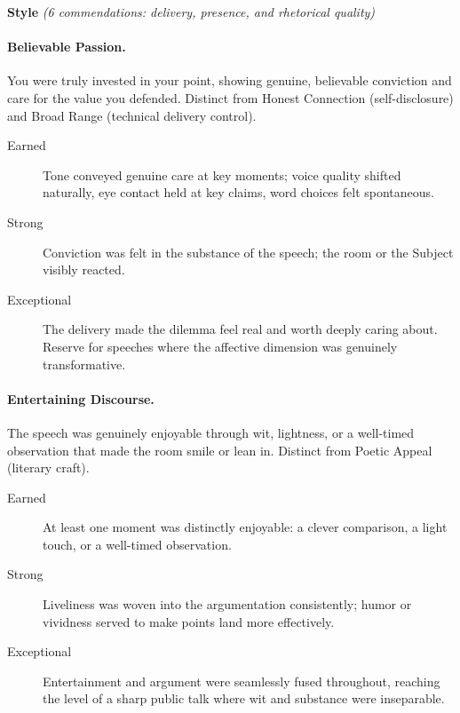 \medskip
\noindent\textbf{Style} \textit{(6 commendations: delivery, presence, and rhetorical quality)}

\paragraph{Believable Passion.} You were truly invested in your point, showing genuine, believable conviction and care for the value you defended. Distinct from Honest Connection (self-disclosure) and Broad Range (technical delivery control).
\begin{description}
    \item[Earned] Tone conveyed genuine care at key moments; voice quality shifted naturally, eye contact held at key claims, word choices felt spontaneous.
    \item[Strong] Conviction was felt in the substance of the speech; the room or the Subject visibly reacted.
    \item[Exceptional] The delivery made the dilemma feel real and worth deeply caring about. Reserve for speeches where the affective dimension was genuinely transformative.
\end{description}

\paragraph{Entertaining Discourse.} The speech was genuinely enjoyable through wit, lightness, or a well-timed observation that made the room smile or lean in. Distinct from Poetic Appeal (literary craft).
\begin{description}
    \item[Earned] At least one moment was distinctly enjoyable: a clever comparison, a light touch, or a well-timed observation.
    \item[Strong] Liveliness was woven into the argumentation consistently; humor or vividness served to make points land more effectively.
    \item[Exceptional] Entertainment and argument were seamlessly fused throughout, reaching the level of a sharp public talk where wit and substance were inseparable.
\end{description}

